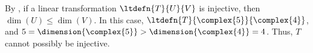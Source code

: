 By , if a linear transformation $\ltdefn{T}{U}{V}$ is injective, then $\dim(U)\le\dim(V)$.  In this case, $\ltdefn{T}{\complex{5}}{\complex{4}}$, and $5=\dimension{\complex{5}} > \dimension{\complex{4}}=4$.  Thus, $T$ cannot possibly be injective. 